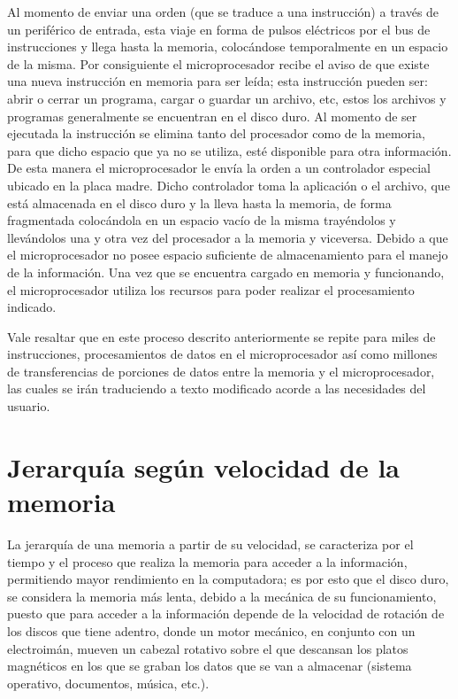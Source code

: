 \documentclass{article}
\begin{document}
\vspace{0.5cm}

Al momento de enviar una orden (que se traduce a una instrucción) a través de un periférico de entrada, esta viaje en forma de pulsos eléctricos por el bus de instrucciones y  llega hasta la memoria, colocándose temporalmente en un espacio de la misma. Por consiguiente el microprocesador recibe el aviso de que existe una nueva instrucción en memoria para ser leída; esta instrucción pueden ser: abrir o cerrar un programa, cargar o guardar un archivo, etc, estos los archivos y programas generalmente se encuentran en el disco duro. Al momento de ser ejecutada la instrucción se elimina tanto del procesador como de la memoria, para que dicho espacio que ya no se utiliza, esté disponible para otra información. De esta manera el microprocesador le envía la orden a un controlador especial ubicado en la placa madre. Dicho controlador toma la aplicación o el archivo, que está almacenada en el disco duro y la lleva hasta la memoria, de forma fragmentada colocándola en un espacio vacío de la misma trayéndolos y llevándolos una y otra vez del procesador a la memoria y viceversa. Debido a que el microprocesador no posee espacio suficiente de almacenamiento para el manejo de la información. Una vez que se encuentra cargado en memoria y funcionando, el microprocesador utiliza los  recursos para poder realizar el  procesamiento indicado. 

\vspace{0.5cm}

Vale resaltar que en este proceso descrito anteriormente se repite para miles de instrucciones, procesamientos de datos en el microprocesador así como millones de transferencias de porciones de datos entre la memoria y el microprocesador, las cuales se irán traduciendo a texto modificado acorde a las necesidades del usuario.

\vspace{0.5cm}


\section{Jerarquía según velocidad de la memoria} \label{contenido}
La jerarquía de una memoria a partir de su velocidad, se caracteriza por el tiempo y el proceso que realiza la memoria para acceder a la información, permitiendo mayor rendimiento en la computadora; es por esto que  el disco duro, se considera la memoria más lenta, debido a la mecánica de su funcionamiento, puesto que para acceder a la información depende de la velocidad de rotación de los discos que tiene adentro, donde un motor mecánico, en conjunto con un electroimán, mueven un cabezal rotativo sobre el que descansan los platos magnéticos en los que se graban los datos que se van a almacenar (sistema operativo, documentos, música, etc.).\cite{comwebsite}
\end{document}
